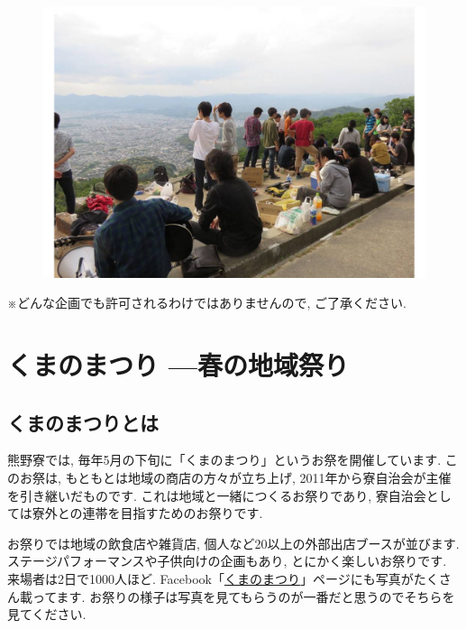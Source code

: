 \documentclass[10pt,b5jsbook,dvips,dvipdfmx,openany]{jsbook}
\theoremstyle{definition}
\begin{document}
	\begin{figure}
		\includegraphics[scale=0.3]{daimonji_1.pdf}
			\vspace*{-\intextsep}
			\label{fig:大文字}
			\end{figure}

 ※どんな企画でも許可されるわけではありませんので, ご了承ください.







\newpage

	\section{くまのまつり ---春の地域祭り}

		\subsection{くまのまつりとは}
		熊野寮では, 毎年5月の下旬に「くまのまつり」というお祭を開催しています. このお祭は, もともとは地域の商店の方々が立ち上げ, 2011年から寮自治会が主催を引き継いだものです. これは地域と一緒につくるお祭りであり, 寮自治会としては寮外との連帯を目指すためのお祭りです.

		お祭りでは地域の飲食店や雑貨店, 個人など20以上の外部出店ブースが並びます. ステージパフォーマンスや子供向けの企画もあり, とにかく楽しいお祭りです. 来場者は2日で1000人ほど. Facebook「\href{https://www.facebook.com/\%e3\%81\%8f\%e3\%81\%be\%e3\%81\%ae\%e3\%81\%be\%e3\%81\%a4\%e3\%82\%8a-789960784504806/}{くまのまつり}」ページにも写真がたくさん載ってます. お祭りの様子は写真を見てもらうのが一番だと思うのでそちらを見てください.
\end{document}
